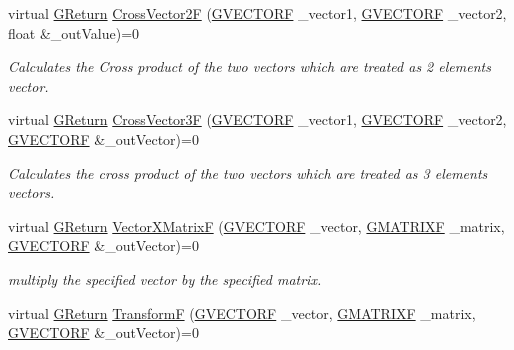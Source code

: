 \begin{DoxyCompactItemize}
virtual \mbox{\hyperlink{namespaceGW_a67a839e3df7ea8a5c5686613a7a3de21}{G\+Return}} \mbox{\hyperlink{classGW_1_1MATH_1_1GVector_a9c8df3e031a91b77a1ea180a8145b9f0}{Cross\+Vector2F}} (\mbox{\hyperlink{structGW_1_1MATH_1_1GVECTORF}{G\+V\+E\+C\+T\+O\+RF}} \+\_\+vector1, \mbox{\hyperlink{structGW_1_1MATH_1_1GVECTORF}{G\+V\+E\+C\+T\+O\+RF}} \+\_\+vector2, float \&\+\_\+out\+Value)=0
\begin{DoxyCompactList}\small\item\em Calculates the Cross product of the two vectors which are treated as 2 elements vector. \end{DoxyCompactList}\item 
virtual \mbox{\hyperlink{namespaceGW_a67a839e3df7ea8a5c5686613a7a3de21}{G\+Return}} \mbox{\hyperlink{classGW_1_1MATH_1_1GVector_a9da6a4d16d2417c6d6f9dee240cad853}{Cross\+Vector3F}} (\mbox{\hyperlink{structGW_1_1MATH_1_1GVECTORF}{G\+V\+E\+C\+T\+O\+RF}} \+\_\+vector1, \mbox{\hyperlink{structGW_1_1MATH_1_1GVECTORF}{G\+V\+E\+C\+T\+O\+RF}} \+\_\+vector2, \mbox{\hyperlink{structGW_1_1MATH_1_1GVECTORF}{G\+V\+E\+C\+T\+O\+RF}} \&\+\_\+out\+Vector)=0
\begin{DoxyCompactList}\small\item\em Calculates the cross product of the two vectors which are treated as 3 elements vectors. \end{DoxyCompactList}\item 
virtual \mbox{\hyperlink{namespaceGW_a67a839e3df7ea8a5c5686613a7a3de21}{G\+Return}} \mbox{\hyperlink{classGW_1_1MATH_1_1GVector_a215565b6f224c48bd00d8625e64a703d}{Vector\+X\+MatrixF}} (\mbox{\hyperlink{structGW_1_1MATH_1_1GVECTORF}{G\+V\+E\+C\+T\+O\+RF}} \+\_\+vector, \mbox{\hyperlink{structGW_1_1MATH_1_1GMATRIXF}{G\+M\+A\+T\+R\+I\+XF}} \+\_\+matrix, \mbox{\hyperlink{structGW_1_1MATH_1_1GVECTORF}{G\+V\+E\+C\+T\+O\+RF}} \&\+\_\+out\+Vector)=0
\begin{DoxyCompactList}\small\item\em multiply the specified vector by the specified matrix. \end{DoxyCompactList}\item 
virtual \mbox{\hyperlink{namespaceGW_a67a839e3df7ea8a5c5686613a7a3de21}{G\+Return}} \mbox{\hyperlink{classGW_1_1MATH_1_1GVector_ad57877d55d7a322db99770af27797957}{TransformF}} (\mbox{\hyperlink{structGW_1_1MATH_1_1GVECTORF}{G\+V\+E\+C\+T\+O\+RF}} \+\_\+vector, \mbox{\hyperlink{structGW_1_1MATH_1_1GMATRIXF}{G\+M\+A\+T\+R\+I\+XF}} \+\_\+matrix, \mbox{\hyperlink{structGW_1_1MATH_1_1GVECTORF}{G\+V\+E\+C\+T\+O\+RF}} \&\+\_\+out\+Vector)=0

\end{DoxyCompactItemize}
